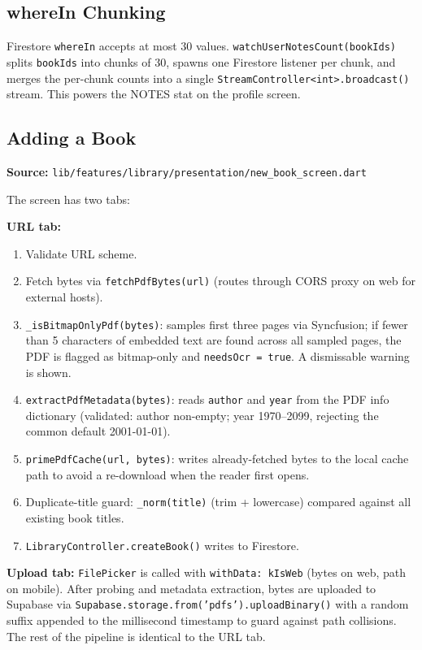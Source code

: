 \documentclass[11pt,a4paper]{article}
\begin{document}
\subsection{whereIn Chunking}

Firestore \texttt{whereIn} accepts at most 30 values. \texttt{watchUserNotesCount(bookIds)}
splits \texttt{bookIds} into chunks of 30, spawns one Firestore listener per chunk, and
merges the per-chunk counts into a single \texttt{StreamController<int>.broadcast()}
stream. This powers the NOTES stat on the profile screen.

\subsection{Adding a Book}

\textbf{Source:} \texttt{lib/features/library/presentation/new\_book\_screen.dart}

The screen has two tabs:

\textbf{URL tab:}
\begin{enumerate}
  \item Validate URL scheme.
  \item Fetch bytes via \texttt{fetchPdfBytes(url)} (routes through CORS proxy on web
    for external hosts).
  \item \texttt{\_isBitmapOnlyPdf(bytes)}: samples first three pages via Syncfusion; if
    fewer than 5 characters of embedded text are found across all sampled pages, the PDF
    is flagged as bitmap-only and \texttt{needsOcr = true}. A dismissable warning is
    shown.
  \item \texttt{extractPdfMetadata(bytes)}: reads \texttt{author} and \texttt{year}
    from the PDF info dictionary (validated: author non-empty; year 1970--2099, rejecting
    the common default 2001-01-01).
  \item \texttt{primePdfCache(url, bytes)}: writes already-fetched bytes to the local
    cache path to avoid a re-download when the reader first opens.
  \item Duplicate-title guard: \texttt{\_norm(title)} (trim + lowercase) compared
    against all existing book titles.
  \item \texttt{LibraryController.createBook()} writes to Firestore.
\end{enumerate}

\textbf{Upload tab:} \texttt{FilePicker} is called with \texttt{withData: kIsWeb}
(bytes on web, path on mobile). After probing and metadata extraction, bytes are uploaded
to Supabase via \texttt{Supabase.storage.from('pdfs').uploadBinary()} with a random
suffix appended to the millisecond timestamp to guard against path collisions. The rest
of the pipeline is identical to the URL tab.
\end{document}
